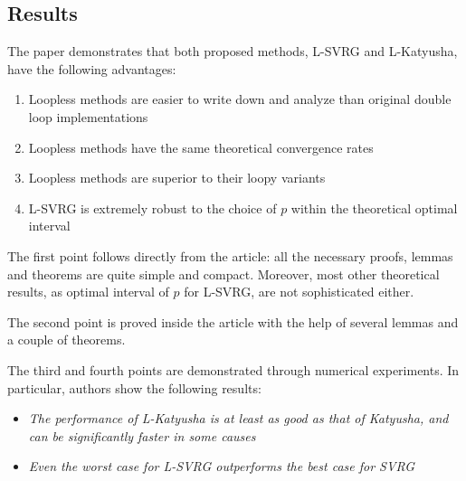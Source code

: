\documentclass{article}
\begin{document}
\subsection{Results}
The paper demonstrates that both proposed methods,
L-SVRG and L-Katyusha, have the following advantages:
\begin{enumerate}
  \item Loopless methods are easier to write down and analyze
  than original double loop implementations
  \item Loopless methods have the same theoretical convergence rates
  \item Loopless methods are superior to their loopy variants
  \item L-SVRG is extremely robust to the choice of \(p\) within the
  theoretical optimal interval
\end{enumerate}

The first point follows directly from the article: all the necessary proofs,
lemmas and theorems are quite simple and compact. Moreover, most other
theoretical results, as optimal interval of \(p\) for L-SVRG, are not
sophisticated either.

The second point is proved inside the article with the help of several lemmas and
a couple of theorems.

The third and fourth points are demonstrated through numerical experiments.
In particular, authors show the following results:
\begin{itemize}
  \item \textit{The performance of L-Katyusha is at least as good as
  that of Katyusha, and can be significantly faster in some causes}
  \item \textit{Even the worst case for L-SVRG outperforms the best case for SVRG}
\end{itemize}
\end{document}

